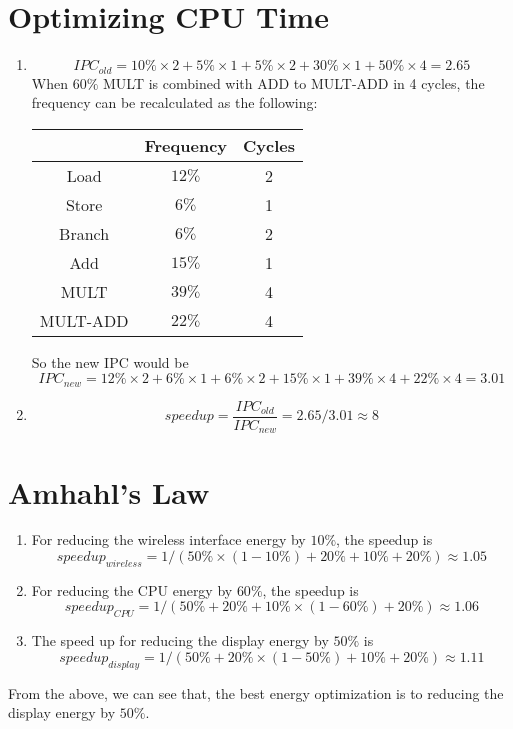 \documentclass{article}
\begin{document}
	\section{Optimizing CPU Time}
	\begin{enumerate}
		\item \begin{equation}
			IPC_{old} = 10\% \times 2 + 5\% \times 1 + 5\% \times 2 + 30\% \times 1 + 50\% \times 4 = 2.65
		\end{equation}
		When $60\%$ MULT is combined with ADD to MULT-ADD in 4 cycles, the frequency can be recalculated as the following: \newline
		\begin{tabular}{|c|c|c|}
			\hline
			& Frequency & Cycles \\
			\hline
			Load & $12\%$ & 2 \\
			\hline
			Store & $6\%$ & 1 \\
			\hline
			Branch & $6\%$ & 2 \\
			\hline
			Add & $15\%$ & 1 \\
			\hline
			MULT & $39\%$ & 4 \\
			\hline
			MULT-ADD & $22\%$ & 4 \\
			\hline
		\end{tabular}
		So the new IPC would be \begin{equation}
			IPC_{new} = 12\% \times 2 + 6\% \times 1 + 6\% \times 2 + 15\% \times 1 + 39\% \times 4 + 22\% \times 4 = 3.01
		\end{equation}
		\item \begin{equation}
			speedup = \frac{IPC_{old}}{IPC_{new}} = 2.65 / 3.01 \approx 8
		\end{equation}
	\end{enumerate}

	\section{Amhahl's Law}
	\begin{enumerate}
		\item For reducing the wireless interface energy by $10\%$, the speedup is \begin{equation}
			speedup_{wireless} = 1 / (50\% \times (1 - 10\%) + 20\% + 10\% + 20\%) \approx 1.05
		\end{equation}
		\item For reducing the CPU energy by $60\%$, the speedup is\begin{equation}
			speedup_{CPU} = 1 / (50\% + 20\% + 10\% \times (1 - 60\%) + 20\%) \approx 1.06
		\end{equation}
		\item The speed up for reducing the display energy by $50\%$ is \begin{equation}
			speedup_{display} = 1 / (50\% + 20\% \times (1 - 50\%) + 10\% + 20\%) \approx 1.11
		\end{equation}
	\end{enumerate}
	From the above, we can see that, the best energy optimization is to reducing the display energy by $50\%$.
\end{document}
